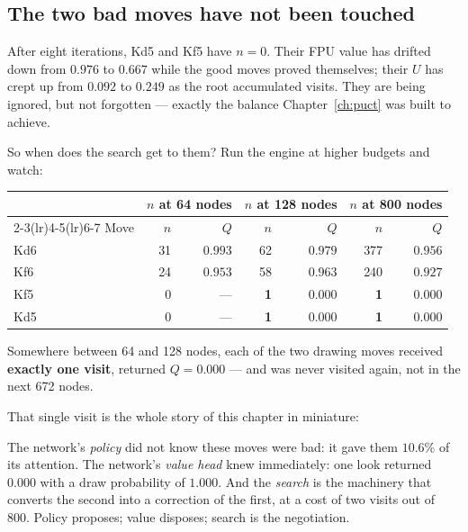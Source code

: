 \subsection{The two bad moves have not been touched}

After eight iterations, Kd5 and Kf5 have $n = 0$. Their FPU value has drifted down from
$0.976$ to $0.667$ while the good moves proved themselves; their $U$ has crept up from
$0.092$ to $0.249$ as the root accumulated visits. They are being ignored, but not
forgotten --- exactly the balance Chapter~\ref{ch:puct} was built to achieve.

So when does the search get to them? Run the engine at higher budgets and watch:

\begin{realdata}[title={Real engine output: the refutation, and its permanence}]
\begin{center}
\begin{tabular}{@{}lrrrrrr@{}}
\toprule
 & \multicolumn{2}{c}{$n$ at 64 nodes} & \multicolumn{2}{c}{$n$ at 128 nodes} & \multicolumn{2}{c}{$n$ at 800 nodes} \\
\cmidrule(lr){2-3}\cmidrule(lr){4-5}\cmidrule(lr){6-7}
Move & $n$ & $Q$ & $n$ & $Q$ & $n$ & $Q$ \\
\midrule
Kd6 & 31 & $0.993$ & 62 & $0.979$ & 377 & $0.956$ \\
Kf6 & 24 & $0.953$ & 58 & $0.963$ & 240 & $0.927$ \\
Kf5 & 0 & --- & \textbf{1} & $\mathbf{0.000}$ & \textbf{1} & $\mathbf{0.000}$ \\
Kd5 & 0 & --- & \textbf{1} & $\mathbf{0.000}$ & \textbf{1} & $\mathbf{0.000}$ \\
\bottomrule
\end{tabular}
\end{center}
Somewhere between 64 and 128 nodes, each of the two drawing moves received \textbf{exactly
one visit}, returned $Q = 0.000$ --- and was never visited again, not in the next 672 nodes.
\end{realdata}

That single visit is the whole story of this chapter in miniature:

\begin{keyidea}
The network's \emph{policy} did not know these moves were bad: it gave them $10.6\%$ of its
attention. The network's \emph{value head} knew immediately: one look returned $0.000$ with a
draw probability of $1.000$. And the \emph{search} is the machinery that converts the second
into a correction of the first, at a cost of two visits out of 800. Policy proposes; value
disposes; search is the negotiation.
\end{keyidea}

